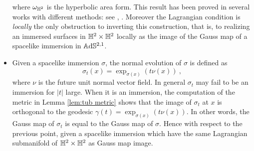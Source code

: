 \begin{itemize}[leftmargin=0.5cm]
where $\omega_{\mathbb{H}^2}$ is the hyperbolic area form. 
This result has been proved in several works with different methods: see \cite{bonsante2017equivariant}, \cite{Seppi_2017}. Moreover the Lagrangian condition is \emph{locally} the only obstruction to inverting this construction, that is, to realizing an immersed surfaces in $\mathbb{H}^2\times\mathbb{H}^2$ locally as the image of the Gauss map of a spacelike immersion in $\mathbb{A}\mathrm{d}\mathbb{S}^{2,1}$.
\item Given a spacelike immersion $\sigma$,  the normal evolution of $\sigma$ is defined as 
\[
    \sigma_t(x)=\exp_{\sigma(x)}(t\nu(x))~,
\]
where $\nu$ is the future unit normal vector field. In general $\sigma_t$ may fail to be an immersion for $|t|$ large. When it is an immersion, the computation of the metric in Lemma \ref{lem:tub metric} shows that the image of $\sigma_t$ at $x$ is orthogonal to the geodesic $\gamma(t)=\exp_{\sigma(x)}(t\nu(x))$. In other words, the Gauss map of $\sigma_t$ is equal to the Gauss map of $\sigma$. Hence with respect to the previous point, given a spacelike immersion which have the same  Lagrangian submanifold of $\mathbb{H}^2\times\mathbb{H}^2$ as Gauss map image.
\end{itemize}